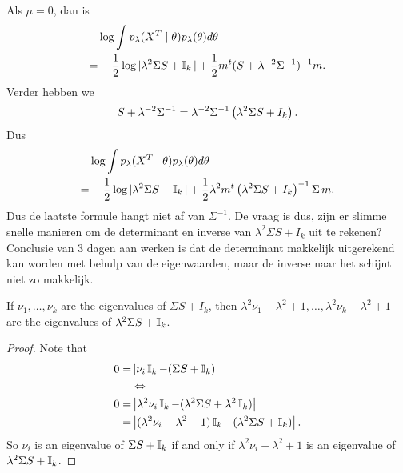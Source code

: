 \documentclass[12pt]{article}
\begin{document}

{\color{cyan}
Als $\mu=0$, dan is 
\begin{align*}
    &\log \int  p_\lambda(X^T\mid\theta)p_\lambda(\theta)d\theta  \\= &-\frac12\log |\lambda^2\Sigma  S + \operatorname{\mathbb{I}}_k|  + \frac12m^t ( S + \lambda^{-2}\Sigma^{-1} )^{-1}m .
\end{align*}
Verder hebben we
\begin{align*}
    S + \lambda^{-2}\Sigma^{-1} = \lambda^{-2}\Sigma^{-1}\left(\lambda^2 \Sigma S + I_k\right). 
\end{align*} 
Dus
\begin{align*}
    &\log \int  p_\lambda(X^T\mid\theta)p_\lambda(\theta)d\theta  \\
    = &-\frac12\log |\lambda^2\Sigma  S + \operatorname{\mathbb{I}}_k|  + \frac12\lambda^{2}m^t \left(\lambda^2 \Sigma S + I_k\right)^{-1}\Sigma\, m .
\end{align*}
Dus de laatste formule hangt niet af van $\Sigma^{-1}$. 
}
{
\color{magenta}
De vraag is dus, zijn er slimme snelle manieren om de determinant en inverse van $\lambda^2 \Sigma S + I_k$ uit te rekenen? 
}
{
\color{red} Conclusie van 3 dagen aan werken is dat de determinant makkelijk uitgerekend kan worden met behulp van de eigenwaarden, maar de inverse naar het schijnt niet zo makkelijk. 
}

\begin{lemma}
    If $\nu_1,\ldots,\nu_k$ are the eigenvalues of $\Sigma S+ I_k$, then $\lambda^2\nu_1-\lambda^2+1,\ldots,\lambda^2\nu_k-\lambda^2+1$ are the eigenvalues of $\lambda^2 \Sigma S + \operatorname{\mathbb{I}}_k$. 
\end{lemma}
\begin{proof}
Note that \begin{align*}
    0=&\left| \nu_i \operatorname{\mathbb{I}}_k - (\Sigma S + \operatorname{\mathbb{I}}_k)  \right|\\
    &\Leftrightarrow\\
    0=&\left| \lambda^2\nu_i \operatorname{\mathbb{I}}_k - (\lambda^2\Sigma S +\lambda^2 \operatorname{\mathbb{I}}_k)  \right|\\
    = &\left| (\lambda^2\nu_i-\lambda^2+1) \operatorname{\mathbb{I}}_k - (\lambda^2\Sigma S +\operatorname{\mathbb{I}}_k)  \right|.
\end{align*}
So $\nu_i$ is an eigenvalue of $\Sigma S+ \operatorname{\mathbb{I}}_k$ if and only if $\lambda^2\nu_i-\lambda^2+1$ is an eigenvalue of $\lambda^2\Sigma S +\operatorname{\mathbb{I}}_k$. 
\end{proof}
\end{document}
